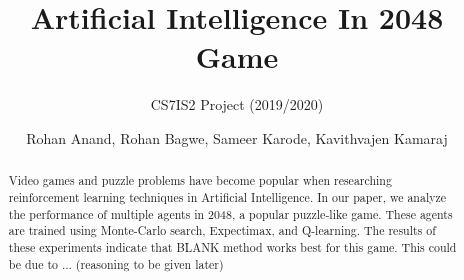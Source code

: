 \documentclass{svproc}
\begin{document}
    \mainmatter
    \title{Artificial Intelligence In 2048 Game
    }
    \subtitle{CS7IS2 Project (2019/2020)}
    \author{Rohan Anand, Rohan Bagwe, Sameer Karode, Kavithvajen Kamaraj}


    \maketitle

    \begin{abstract}
        Video games and puzzle problems have become popular when researching reinforcement learning techniques in Artificial Intelligence. In our paper, we analyze the performance of multiple agents in 2048, a popular puzzle-like game. These agents are trained using Monte-Carlo search, Expectimax, and Q-learning. The results of these experiments indicate that BLANK method works best for this game. This could be due to ... (reasoning to be given later)
    \end{abstract}
%

\end{document}
